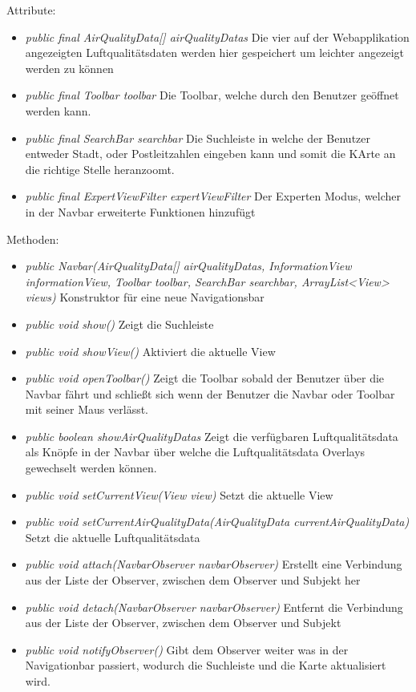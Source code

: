 Attribute:
\begin{itemize} 
    \item \emph{public final AirQualityData[] airQualityDatas} Die vier auf der Webapplikation angezeigten Luftqualitätsdaten werden hier gespeichert um leichter angezeigt werden zu können
    \item \emph{public final Toolbar toolbar} Die Toolbar, welche durch den Benutzer geöffnet werden kann.
    \item \emph{public final SearchBar searchbar} Die Suchleiste in welche der Benutzer entweder Stadt, oder Postleitzahlen eingeben kann und somit die KArte an die richtige Stelle heranzoomt.
    \item \emph{public final ExpertViewFilter expertViewFilter} Der Experten Modus, welcher in der Navbar erweiterte Funktionen hinzufügt
    
\end{itemize}
Methoden:
\begin{itemize} 
    \item \emph{public Navbar(AirQualityData[] airQualityDatas, InformationView informationView, Toolbar toolbar, SearchBar searchbar, ArrayList<View> views)} Konstruktor für eine neue Navigationsbar
    \item \emph{public void show()} Zeigt die Suchleiste
    \item \emph{public void showView()} Aktiviert die aktuelle View
    \item \emph{public void openToolbar()} Zeigt die Toolbar sobald der Benutzer über die Navbar fährt und schließt sich wenn der Benutzer die Navbar oder Toolbar mit seiner Maus verlässt. 
    \item \emph{public boolean showAirQualityDatas} Zeigt die verfügbaren Luftqualitätsdata als Knöpfe in der Navbar über welche die Luftqualitätsdata Overlays gewechselt werden können.
    \item \emph{public void setCurrentView(View view)} Setzt die aktuelle View
    \item \emph{public void setCurrentAirQualityData(AirQualityData currentAirQualityData)} Setzt die aktuelle Luftqualitätsdata
    \item \emph{public void attach(NavbarObserver navbarObserver)} Erstellt eine Verbindung aus der Liste der Observer, zwischen dem Observer und Subjekt her
    \item \emph{public void detach(NavbarObserver navbarObserver)} Entfernt die Verbindung aus der Liste der Observer, zwischen dem Observer und Subjekt
    \item \emph{public void notifyObserver()} Gibt dem Observer weiter was in der Navigationbar passiert, wodurch die Suchleiste und die Karte aktualisiert wird.
\end{itemize}

